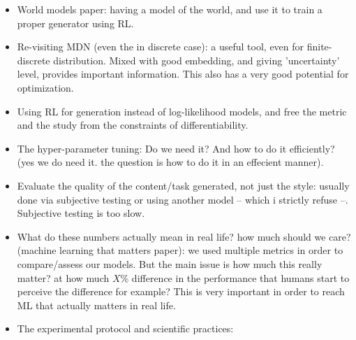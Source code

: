 \begin{itemize}[noitemsep]
    \item World models paper: having a model of the world, and use it to train a proper generator using RL.

    \item Re-visiting MDN (even the in discrete case): a useful tool, even for finite-discrete distribution. Mixed with good embedding, and giving 'uncertainty' level, provides important information. This also has a very good potential for optimization.

    \item Using RL for generation instead of log-likelihood models, and free the metric and the study from the constraints of differentiability.
    \item The hyper-parameter tuning: Do we need it? And how to do it efficiently? (yes we do need it. the question is how to do it in an effecient manner).

    \item Evaluate the quality of the content/task generated, not just the style: usually done via subjective testing or using another model -- which i strictly refuse --. Subjective testing is too slow.

    \item What do these numbers actually mean in real life? how much should we care? \cite{wagstaff2012machine} (machine learning that matters paper): we used multiple metrics in order to compare/assess our models. But the main issue is how much this really matter? at how much $X\%$ difference in the performance that humans start to perceive the difference for example? This is very important in order to reach ML that actually matters in real life.

    \item The experimental protocol and scientific practices:
\end{itemize}

